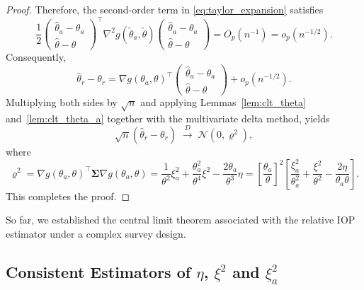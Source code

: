 \documentclass[12pt]{article}
\theoremstyle{plain}
\theoremstyle{definition}
\begin{document}
\begin{proof}
Therefore, the second-order term in \eqref{eq:taylor_expansion} satisfies
\[
\frac{1}{2}
\begin{pmatrix}
\hat{\theta}_a - \theta_a \\
\hat{\theta} - \theta
\end{pmatrix}^\top
\nabla^2 g(\tilde{\theta}_a,\tilde{\theta})
\begin{pmatrix}
\hat{\theta}_a - \theta_a \\
\hat{\theta} - \theta
\end{pmatrix}
= O_p(n^{-1})
= o_p(n^{-1/2}).
\]
Consequently,
\[
\hat{\theta}_r - \theta_r
=
\nabla g(\theta_a,\theta)^\top
\begin{pmatrix}
\hat{\theta}_a - \theta_a \\
\hat{\theta} - \theta
\end{pmatrix}
+ o_p(n^{-1/2}).
\]
Multiplying both sides by \( \sqrt{n} \) and applying Lemmas~\ref{lem:clt_theta} and~\ref{lem:clt_theta_a}
together with the multivariate delta method, yields
\[
\sqrt{n}(\hat{\theta}_r - \theta_r)
\;\xrightarrow{D}\;
\mathcal{N}(0,\varrho^2),
\]
where
\[\varrho^2
=
\nabla g(\theta_a,\theta)^\top
\boldsymbol{\Sigma}
\nabla g(\theta_a,\theta)
    = \frac{1}{\theta^2}\xi_a^2 + \frac{\theta_a^2}{\theta^4}\xi^2 - \frac{2\theta_a}{\theta^3}\eta
    = \left[\frac{\theta_a}{\theta}\right]^2\left[\frac{\xi_a^2}{\theta_a^2} + \frac{\xi^2}{\theta^2} - \frac{2\eta}{\theta_a\theta}\right].
\]
This completes the proof.
\end{proof}
So far, we established the central limit theorem associated with the relative IOP estimator under a complex survey design.

\subsection{Consistent Estimators of $\eta$, $\xi^2$ and $\xi^2_a$}
\label{ssec:consist_est}
\end{document}
